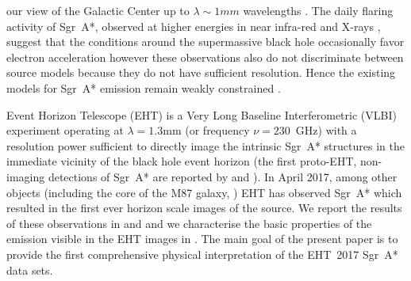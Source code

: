 our view of the Galactic Center up to $\lambda \sim 1mm$ wavelengths \citep{2016ApJ...824...40O, 2017MNRAS.471.3563D, 2018ApJ...865..104J,2019A&A...621A.119B}. The daily flaring activity of Sgr~A*, observed at higher energies in near infra-red and X-rays \citep{2009ApJ...698..676D,2019ApJ...886...96H}, suggest that the conditions around the supermassive black hole occasionally favor electron acceleration \citep{2000ApJ...541..234O,2020MNRAS.494.5923P} however these observations also do not discriminate between source models because they do not have sufficient resolution. Hence the existing models for Sgr~A* emission remain weakly constrained \citep[see e.g.,][]{2005ApJ...621..785G,2006MNRAS.370..219M,
  2007A&A...474....1M, 2007MNRAS.379.1519M,2007ApJ...671.1696S, 2009A&A...508L..13M,
  2009ApJ...701..521C, 2009ApJ...706..497M, 2012ApJ...746L..10D,
  2012MNRAS.421.1315Z, 2012ApJ...755..133S, 2013A&A...559L...3M, 2014A&A...570A...7M,  2015ApJ...812..103C,
  2015ApJ...799....1C, 
  2016A&A...588A..57F,
  2016ApJ...826...77B, 2016ApJ...831....4P, 2016MNRAS.455.2187M,
  2017ApJ...837..180G, 2017ApJ...844...35M, 2017ApJ...851..148M,
  2017MNRAS.467.3604R, 2018A&A...612A..34D, 2018ApJ...856..163M,
 2018ApJ...863..148P,
 2018JCAP...07..015H, 2018MNRAS.478.1875J,
  2018MNRAS.478.5209C,  2019ApJ...884..148B,
  2020ApJ...896L...6R, 2020ApJ...897...99T, 2020MNRAS.492.3272R,
  2020MNRAS.493.1404A, 2020MNRAS.494.4168D, 
  2020MNRAS.497.4999D, 2020ApJ...896L...6R, 2021ApJ...917....8B,
  2021MNRAS.502.2023P,2021arXiv210105327E}.


Event Horizon Telescope (EHT) is a Very Long Baseline Interferometric (VLBI) experiment 
operating at $\lambda=1.3$mm (or frequency $\nu=230$~GHz)
with a resolution power sufficient to directly image the intrinsic Sgr~A* structures in the immediate vicinity of the black hole event horizon (the first proto-EHT, non-imaging detections of Sgr~A* are reported by \citealt{2008Natur.455...78D, 2015Sci...350.1242J} and \citealt{2018ApJ...859...60L}). In April 2017, among other objects (including the core of the M87 galaxy, ) EHT has observed Sgr~A* which resulted in the first ever horizon scale images of the source. We report the results of these observations in  and  and we characterise the basic properties of the emission visible in the EHT images in . The main goal of the present paper  is to provide the first comprehensive physical interpretation of the EHT~2017 Sgr~A* data sets. 

